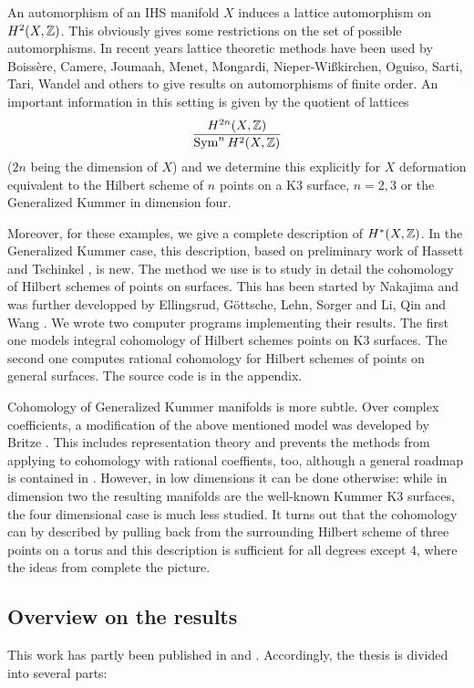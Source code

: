 An automorphism of an IHS manifold $X$ induces a lattice automorphism on $H^2(X,\mathbb{Z})$. This obviously gives some restrictions on the set of possible automorphisms.
In recent years lattice theoretic methods have been used by
Boiss\`ere, Camere, Joumaah, Menet, Mongardi, Nieper-Wi\ss kirchen, Oguiso, Sarti, Tari, Wandel and others to give results on
automorphisms of finite order. 
An important information in this setting is given by the quotient of lattices
$$
\frac{H^{2n}(X,\mathbb{Z})}{\operatorname{Sym}^n H^2(X,\mathbb{Z})}
$$
($2n$ being the dimension of $X$) and we determine this explicitly for $X$ deformation equivalent to the Hilbert scheme of $n$ points on a K3 surface, $n=2,3$ or the Generalized Kummer in dimension four. 

Moreover, for these examples, we give a complete description of $H^*(X,\mathbb{Z})$. In the Generalized Kummer case, this description, based on preliminary work of Hassett and Tschinkel \cite{Hassett}, is new. 
The method we use is to study in detail the cohomology of Hilbert schemes of points on surfaces. This has been started by Nakajima \cite{Nakajima} and was further developped by Ellingsrud, G\"ottsche, Lehn, Sorger \cite{EGL,LehnSorger} and Li, Qin and Wang \cite{LiQinWang,LiQinWang2,QinWang}.
We wrote two computer programs implementing their results. The first one models integral cohomology of Hilbert schemes points on K3 surfaces. The second one computes rational cohomology for Hilbert schemes of points on general surfaces. The source code is in the appendix. 

Cohomology of Generalized Kummer manifolds is more subtle. Over complex coefficients, a modification of the above mentioned model was developed by Britze \cite{Britze}. This includes representation theory and prevents the methods from applying to cohomology with rational coeffients, too, although a general roadmap is contained in \cite{Twisted}.
However, in low dimensions it can be done otherwise: while in dimension two the resulting manifolds are the well-known Kummer K3 surfaces, the four dimensional case is much less studied. It turns out that the cohomology can by described by pulling back from the surrounding Hilbert scheme of three points on a torus and this description is sufficient for all degrees except $4$, where the ideas from \cite{Hassett} complete the picture.

\subsection{Overview on the results}
This work has partly been published in \cite{Kapfer2} and \cite{Kapfer}. 
Accordingly, the thesis is divided into several parts:

